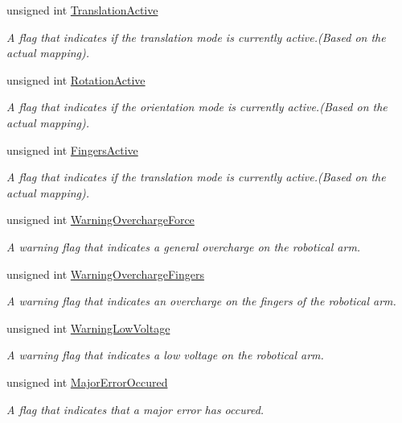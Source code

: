 \begin{DoxyCompactItemize}
unsigned int \hyperlink{struct_system_status_a426a7b594f1aa2672e01c37c93515b1c}{Translation\+Active}
\begin{DoxyCompactList}\small\item\em A flag that indicates if the translation mode is currently active.(Based on the actual mapping). \end{DoxyCompactList}\item 
unsigned int \hyperlink{struct_system_status_a4f743187089a28cd66438e804c3dc8cb}{Rotation\+Active}
\begin{DoxyCompactList}\small\item\em A flag that indicates if the orientation mode is currently active.(Based on the actual mapping). \end{DoxyCompactList}\item 
unsigned int \hyperlink{struct_system_status_ac7a9d66164763c99d7164419724cc71b}{Fingers\+Active}
\begin{DoxyCompactList}\small\item\em A flag that indicates if the translation mode is currently active.(Based on the actual mapping). \end{DoxyCompactList}\item 
unsigned int \hyperlink{struct_system_status_a87405334f1d98467521181af5b58485c}{Warning\+Overcharge\+Force}
\begin{DoxyCompactList}\small\item\em A warning flag that indicates a general overcharge on the robotical arm. \end{DoxyCompactList}\item 
unsigned int \hyperlink{struct_system_status_a055bea9394191a3e0fcaf740b78d651c}{Warning\+Overcharge\+Fingers}
\begin{DoxyCompactList}\small\item\em A warning flag that indicates an overcharge on the fingers of the robotical arm. \end{DoxyCompactList}\item 
unsigned int \hyperlink{struct_system_status_a690324ff7d7b755fdaf01efda3adf044}{Warning\+Low\+Voltage}
\begin{DoxyCompactList}\small\item\em A warning flag that indicates a low voltage on the robotical arm. \end{DoxyCompactList}\item 
unsigned int \hyperlink{struct_system_status_a6c7ed26ae5b10f514f9f10adb5cb2839}{Major\+Error\+Occured}
\begin{DoxyCompactList}\small\item\em A flag that indicates that a major error has occured. \end{DoxyCompactList}\end{DoxyCompactItemize}


